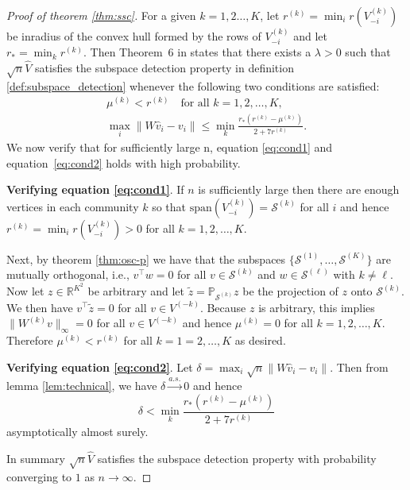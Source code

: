 \documentclass[
  11pt,
]{article}
\theoremstyle{definition}
\theoremstyle{definition}
\theoremstyle{definition}
\theoremstyle{definition}
\theoremstyle{remark}
\begin{document}
\begin{proof}[Proof of theorem \ref{thm:ssc}]
For a given $k = 1,2\dots,K$, let $r^{(k)} = \min_{i}r(V_{-i}^{(k)})$ be inradius of the convex hull formed by
the rows of $V_{-i}^{(k)}$ and let $r_* = \min_{k} r^{(k)}$. Then Theorem~6 in
\citet{jmlr-v28-wang13} states that there exists a $\lambda > 0$
such that $\sqrt{n} \hat{V}$ satisfies the subspace detection property in definition \ref{def:subspace_detection} whenever the following two conditions are satisfied: 
\begin{gather}
  \label{eq:cond1}
  \mu^{(k)} < r^{(k)} \quad \text{for all $k = 1,2,\dots,K$}, \\
  \label{eq:cond2}
  \max_{i} \|W \hat{v}_{i} - v_{i}\| \leq \min_{k} \frac{r_*(r^{(k)} -
    \mu^{(k)})}{2 + 7 r^{(k)}}.
\end{gather}
We now verify that for sufficiently large n, equation \eqref{eq:cond1} and equation~\eqref{eq:cond2}
holds with high probability.

{\bf Verifying equation \eqref{eq:cond1}}. If $n$ is sufficiently large then
there are enough vertices in each community $k$ so that
$\mathrm{span}(V_{-i}^{(k)}) = \mathcal{S}^{(k)}$ for all $i$ and hence
\(r^{(k)} = \min_{i} r(V_{-i}^{(k)}) > 0\) for
all $k = 1,2,\dots,K$. 

Next, by theorem \ref{thm:osc-p} we have that the subspaces
$\{\mathcal{S}^{(1)}, \dots, \mathcal{S}^{(K)}\}$
are mutually orthogonal, i.e., $v^{\top} w = 0$ for all $v \in
\mathcal{S}^{(k)}$ and $w \in \mathcal{S}^{(\ell)}$ with $k \not =
\ell$. Now let $z \in \mathbb{R}^{K^2}$ be arbitrary and let
$\tilde{z} = \mathbb{P}_{\mathcal{S}^{(k)}} z$ be the projection of
$z$ onto $\mathcal{S}^{(k)}$. We then have $v^{\top} \tilde{z} =
0$ for all $v \in V^{(-k)}$. Because $z$ is arbitrary, this implies 
$\|W^{(k)} v\|_{\infty} = 0$ for all $v
\in V^{(-k)}$ and hence $\mu^{(k)} = 0$ for all $k
=1,2,\dots,K$. Therefore $\mu^{(k)} < r^{(k)}$ for all $k =
1=2,\dots,K$ as desired.

{\bf Verifying equation \eqref{eq:cond2}}.
Let $\delta = \max_{i} \sqrt{n} \|W \hat{v}_{i} - v_{i}\|$. 
Then from lemma \ref{lem:technical}, we have \(\delta \stackrel{a.s.}{\to} 0\) and hence
$$\delta < \min_{k} \frac{r_* (r^{(k)} - \mu^{(k)})}{2 + 7 r^{(k)}}$$
asymptotically almost surely. 

In summary $\sqrt{n} \hat{V}$ satisfies the subspace detection property with probability converging to $1$ as \(n \to \infty\).
\end{proof}
\end{document}
